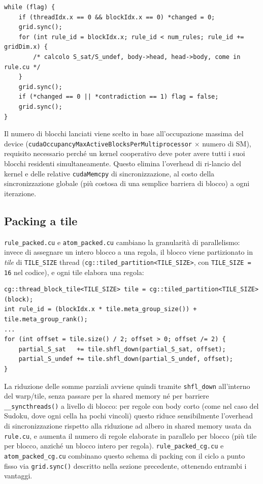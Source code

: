 \documentclass[11pt,a4paper]{article}
\begin{document}
\begin{lstlisting}
while (flag) {
    if (threadIdx.x == 0 && blockIdx.x == 0) *changed = 0;
    grid.sync();
    for (int rule_id = blockIdx.x; rule_id < num_rules; rule_id += gridDim.x) {
        /* calcolo S_sat/S_undef, body->head, head->body, come in rule.cu */
    }
    grid.sync();
    if (*changed == 0 || *contradiction == 1) flag = false;
    grid.sync();
}
\end{lstlisting}

Il numero di blocchi lanciati viene scelto in base all'occupazione massima del device
(\texttt{cudaOccupancyMaxActiveBlocksPerMultiprocessor} $\times$ numero di SM), requisito necessario
perché un kernel cooperativo deve poter avere tutti i suoi blocchi residenti simultaneamente.
Questo elimina l'overhead di ri-lancio del kernel e delle relative \texttt{cudaMemcpy} di
sincronizzazione, al costo della sincronizzazione globale (più costosa di una semplice barriera di
blocco) a ogni iterazione.

\subsection{Packing a tile}

\texttt{rule\_packed.cu} e \texttt{atom\_packed.cu} cambiano la granularità di parallelismo:
invece di assegnare un intero blocco a una regola, il blocco viene partizionato in \emph{tile} di
\texttt{TILE\_SIZE} thread (\texttt{cg::tiled\_partition<TILE\_SIZE>}, con \texttt{TILE\_SIZE = 16}
nel codice), e ogni tile elabora una regola:

\begin{lstlisting}
cg::thread_block_tile<TILE_SIZE> tile = cg::tiled_partition<TILE_SIZE>(block);
int rule_id = (blockIdx.x * tile.meta_group_size()) + tile.meta_group_rank();
...
for (int offset = tile.size() / 2; offset > 0; offset /= 2) {
    partial_S_sat   += tile.shfl_down(partial_S_sat, offset);
    partial_S_undef += tile.shfl_down(partial_S_undef, offset);
}
\end{lstlisting}

La riduzione delle somme parziali avviene quindi tramite \texttt{shfl\_down} all'interno del
warp/tile, senza passare per la shared memory né per barriere \texttt{\_\_syncthreads()} a livello
di blocco: per regole con body corto (come nel caso del Sudoku, dove ogni cella ha pochi vincoli)
questo riduce sensibilmente l'overhead di sincronizzazione rispetto alla riduzione ad albero in
shared memory usata da \texttt{rule.cu}, e aumenta il numero di regole elaborate in parallelo per
blocco (più tile per blocco, anziché un blocco intero per regola). \texttt{rule\_packed\_cg.cu} e
\texttt{atom\_packed\_cg.cu} combinano questo schema di packing con il ciclo a punto fisso via
\texttt{grid.sync()} descritto nella sezione precedente, ottenendo entrambi i vantaggi.
\end{document}
